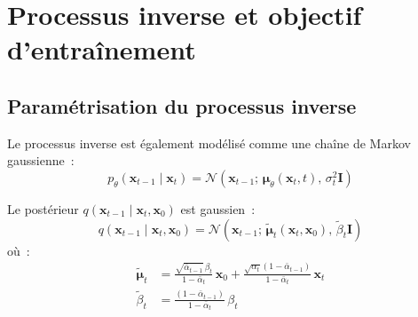 \section{Processus inverse et objectif d'entra\^inement}
\label{sec:diffusion-reverse}

\subsection{Param\'etrisation du processus inverse}

Le processus inverse est \'egalement mod\'elis\'e comme une cha\^ine de Markov gaussienne~:
\begin{equation}
p_\theta(\mathbf{x}_{t-1} \mid \mathbf{x}_t) = \mathcal{N}\!\left(\mathbf{x}_{t-1};\, \boldsymbol{\mu}_\theta(\mathbf{x}_t, t),\, \sigma_t^2 \mathbf{I}\right)
\label{eq:reverse-step}
\end{equation}

\begin{theoreme}
\label{thm:posterior}
Le post\'erieur $q(\mathbf{x}_{t-1} \mid \mathbf{x}_t, \mathbf{x}_0)$ est gaussien~:
\begin{equation}
q(\mathbf{x}_{t-1} \mid \mathbf{x}_t, \mathbf{x}_0) = \mathcal{N}\!\left(\mathbf{x}_{t-1};\, \tilde{\boldsymbol{\mu}}_t(\mathbf{x}_t, \mathbf{x}_0),\, \tilde{\beta}_t \mathbf{I}\right)
\end{equation}
o\`u~:
\begin{align}
\tilde{\boldsymbol{\mu}}_t &= \frac{\sqrt{\bar{\alpha}_{t-1}}\,\beta_t}{1 - \bar{\alpha}_t}\,\mathbf{x}_0 + \frac{\sqrt{\alpha_t}(1 - \bar{\alpha}_{t-1})}{1 - \bar{\alpha}_t}\,\mathbf{x}_t \\
\tilde{\beta}_t &= \frac{(1 - \bar{\alpha}_{t-1})}{1 - \bar{\alpha}_t}\,\beta_t
\end{align}
\end{theoreme}

